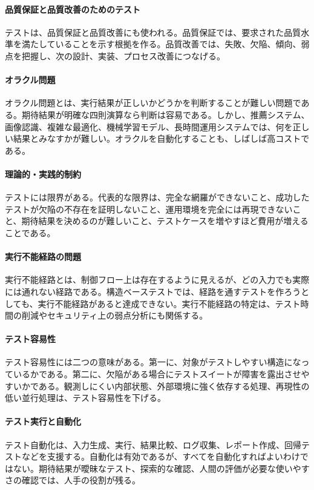 \paragraph{品質保証と品質改善のためのテスト}
テストは、品質保証と品質改善にも使われる。品質保証では、要求された品質水準を満たしていることを示す根拠を作る。品質改善では、失敗、欠陥、傾向、弱点を把握し、次の設計、実装、プロセス改善につなげる。

\paragraph{オラクル問題}
オラクル問題とは、実行結果が正しいかどうかを判断することが難しい問題である。期待結果が明確な四則演算なら判断は容易である。しかし、推薦システム、画像認識、複雑な最適化、機械学習モデル、長時間運用システムでは、何を正しい結果とみなすかが難しい。オラクルを自動化することも、しばしば高コストである。

\paragraph{理論的・実践的制約}
テストには限界がある。代表的な限界は、完全な網羅ができないこと、成功したテストが欠陥の不存在を証明しないこと、運用環境を完全には再現できないこと、期待結果を決めるのが難しいこと、テストケースを増やすほど費用が増えることである。

\paragraph{実行不能経路の問題}
実行不能経路とは、制御フロー上は存在するように見えるが、どの入力でも実際には通れない経路である。構造ベーステストでは、経路を通すテストを作ろうとしても、実行不能経路があると達成できない。実行不能経路の特定は、テスト時間の削減やセキュリティ上の弱点分析にも関係する。

\paragraph{テスト容易性}
テスト容易性には二つの意味がある。第一に、対象がテストしやすい構造になっているかである。第二に、欠陥がある場合にテストスイートが障害を露出させやすいかである。観測しにくい内部状態、外部環境に強く依存する処理、再現性の低い並行処理は、テスト容易性を下げる。

\paragraph{テスト実行と自動化}
テスト自動化は、入力生成、実行、結果比較、ログ収集、レポート作成、回帰テストなどを支援する。自動化は有効であるが、すべてを自動化すればよいわけではない。期待結果が曖昧なテスト、探索的な確認、人間の評価が必要な使いやすさの確認では、人手の役割が残る。

